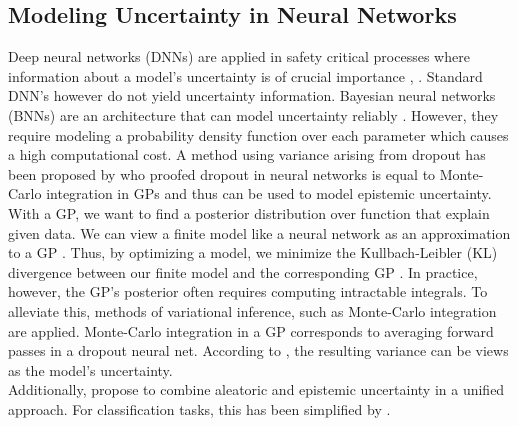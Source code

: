 \documentclass[a4paper,cleardoubleempty,BCOR1cm, 11pt]{report}
\begin{document}




\subsection{Modeling Uncertainty in Neural Networks} %
Deep neural networks (DNNs) are applied in safety critical processes where information about a model's uncertainty is of crucial importance \cite{najafabadi2015deep}, \cite{krzywinski2013importance}. Standard DNN's however do not yield uncertainty information. Bayesian neural networks (BNNs) are an architecture that can model uncertainty reliably \cite{mullachery2018bayesian}. However, they require modeling a probability density function over each parameter which causes a high computational cost. A method using variance arising from dropout has been proposed by \citet{gal2016dropout} who proofed dropout in neural networks is equal to Monte-Carlo integration in GPs and thus can be used to model epistemic uncertainty.\\



With a GP, we want to find a posterior distribution over function that explain given data. We can view a finite model like a neural network as an approximation to a GP \cite{damianou2013deep}. Thus, by optimizing a model, we minimize the Kullbach-Leibler (KL) divergence between our finite model and the corresponding GP \cite{gal2016dropout}. In practice, however, the GP's posterior often requires computing intractable integrals. To alleviate this, methods of variational inference, such as Monte-Carlo integration are applied. Monte-Carlo integration in a GP corresponds to averaging forward passes in a dropout neural net. According to \citet{gal2016dropout}, the resulting variance can be views as the model's uncertainty.
\\
Additionally, \citet{kendall2017uncertainties} propose to combine aleatoric and epistemic uncertainty in a unified approach. For classification tasks, this has been simplified by \citet{kwon2020uncertainty}.
\end{document}
